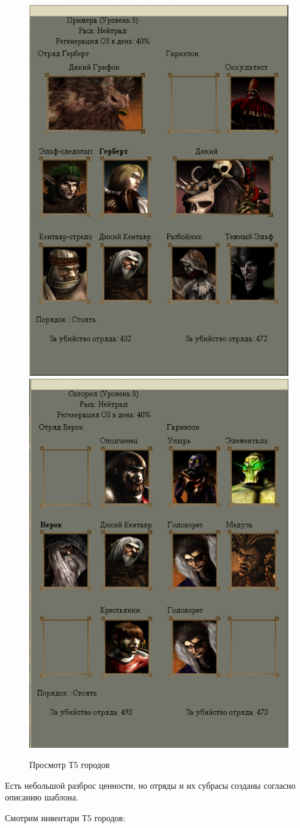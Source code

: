 \begin{figure}[H]
\begin{center}
\includegraphics[width=.45\linewidth]{docImages/townT5Preview.png}
\includegraphics[width=.45\linewidth]{docImages/townT5Preview2.png}
\caption{Просмотр Т5 городов}
\end{center}
\end{figure}

Есть небольшой разброс ценности, но отряды и их субрасы созданы согласно описанию шаблона.

Смотрим инвентари Т5 городов:

